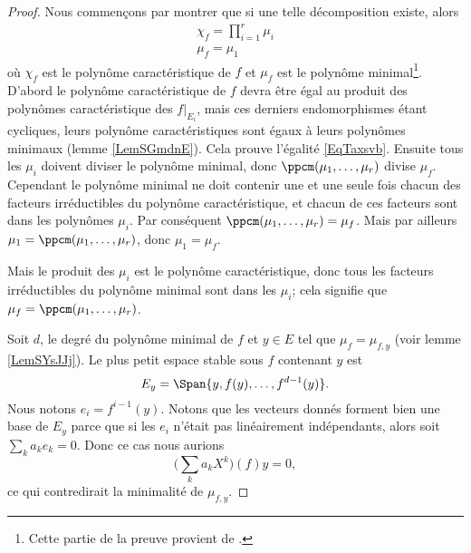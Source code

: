 \begin{proof}
    Nous commençons par montrer que si une telle décomposition existe, alors
    \begin{subequations}    \label{subEqzcGouz}
        \begin{align}
            \chi_f=\prod_{i=1}^r\mu_i  \label{EqTaxsvb}\\
            \mu_f=\mu_1
        \end{align}
    \end{subequations}
    où \( \chi_f\) est le polynôme caractéristique de \( f\) et \( \mu_f\) est le polynôme minimal\footnote{Cette partie de la preuve provient de \cite{MoncetIVS}.}. D'abord le polynôme caractéristique de \( f\) devra être égal au produit des polynômes caractéristique des \( f|_{E_i}\), mais ces derniers endomorphismes étant cycliques, leurs polynôme caractéristiques sont égaux à leurs polynômes minimaux (lemme \ref{LemSGmdnE}). Cela prouve l'égalité \eqref{EqTaxsvb}. Ensuite tous les \( \mu_i\) doivent diviser le polynôme minimal, donc \( \ppcm(\mu_1,\ldots, \mu_r)\) divise \(\mu_f\). Cependant le polynôme minimal ne doit contenir une et une seule fois chacun des facteurs irréductibles du polynôme caractéristique, et chacun de ces facteurs sont dans les polynômes \( \mu_i\). Par conséquent \( \ppcm(\mu_1,\ldots, \mu_r)=\mu_f\). Mais par ailleurs \( \mu_1=\ppcm(\mu_1,\ldots, \mu_r)\), donc \( \mu_1=\mu_f\).
    
    Mais le produit des \( \mu_i\) est le polynôme caractéristique, donc tous les facteurs irréductibles du polynôme minimal sont dans les \( \mu_i\); cela signifie que \( \mu_f=\ppcm(\mu_1,\ldots, \mu_r)\).

    Soit \( d\), le degré du polynôme minimal de \( f\) et \( y\in E\) tel que \( \mu_f=\mu_{f,y}\) (voir lemme \ref{LemSYsJJj}). Le plus petit espace stable sous \( f\) contenant \( y\) est
    \begin{equation}
        E_y=\Span\{ y,f(y),\ldots, f^{d-1}(y) \}.
    \end{equation}
    Nous notons \( e_i=f^{i-1}(y)\). Notons que les vecteurs donnés forment bien une base de \( E_y\) parce que si les \( e_i\) n'était pas linéairement indépendants, alors soit \( \sum_ka_ke_k=0\). Donc ce cas nous aurions
    \begin{equation}
        \big( \sum_ka_kX^k \big)(f)y=0,
    \end{equation}
    ce qui contredirait la minimalité de \( \mu_{f,y}\).


\end{proof}
